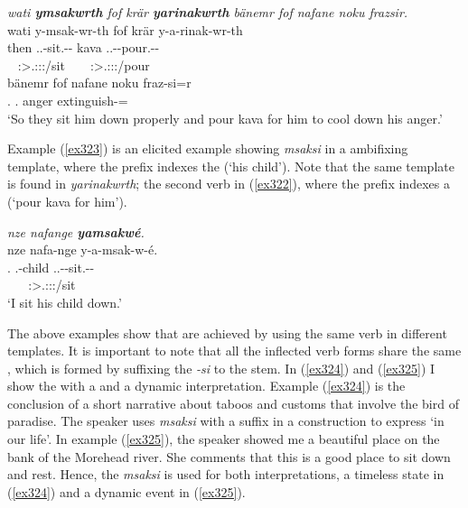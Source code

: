 \begin{exe}
	\ex \emph{wati \textbf{ymsakwrth} fof krär \textbf{yarinakwrth} bänemr fof nafane noku frazsir.}\\
	\glll wati y-msak-wr-th fof krär y-a-rinak-wr-th\\
	then \Tsg.\Masc.\Alph-sit.\Ext-\Ndu-\Stnsg{} {\Emph} kava \Tsg.\Masc.\Alph-\Vc-pour.\Ext-\Ndu-\Stnsg{}\\
	~ {\footnotesize \Stpl:\Sbj>\Tsg.\Masc:\Obj:\Nonpast:\Ipfv/sit} ~ ~ {\footnotesize \Stpl:\Sbj>\Tsg.\Masc:\Io:\Nonpast:\Ipfv/pour}\\
	\sn
	\gll bänemr fof nafane noku fraz-si=r\\
	\Recog.{\Purp} {\Emph} \Tsg.{\Poss} anger extinguish-\Nmlz={\Purp}\\
	\trans `So they sit him down properly and pour kava for him to cool down his anger.' 
	\label{ex322}
\end{exe}

Example (\ref{ex323}) is an elicited example showing \emph{msaksi} in a  ambifixing template, where the  prefix indexes the  (`his child'). Note that the same template is found in \emph{yarinakwrth}; the second verb in (\ref{ex322}), where the  prefix indexes a  (`pour kava for him').

\begin{exe}
	\ex \textit{nze nafange \textbf{yamsakwé}.}\\
	\glll nze nafa-nge y-a-msak-w-é.\\
	 \Fsg{}.{\Erg} \Third.\Poss-child \Tsg.\Masc.\Alph{}-{\Vc}-sit.{\Ext}-{\Ndu}-\Fsg{}\\
	  ~ ~ {\footnotesize \Fsg:\Sbj>\Tsg.\Masc:\Io:\Nonpast:\Ipfv/sit}\\
	\trans `I sit his child down.'
	\label{ex323}
\end{exe}

The above examples show that  are achieved by using the same verb in different templates. It is important to note that all the inflected verb forms share the same , which is formed by suffixing the  \emph{-si} to the stem. In (\ref{ex324}) and (\ref{ex325}) I show the  with a  and a dynamic interpretation. Example (\ref{ex324}) is the conclusion of a short narrative about taboos and customs that involve the bird of paradise. The speaker uses \emph{msaksi} with a   suffix in a  construction to express `in our life'. In example (\ref{ex325}), the speaker showed me a beautiful place on the bank of the Morehead river. She comments that this is a good place to sit down and rest. Hence, the  \emph{msaksi} is used for both interpretations, a timeless state in (\ref{ex324}) and a dynamic event in (\ref{ex325}).

